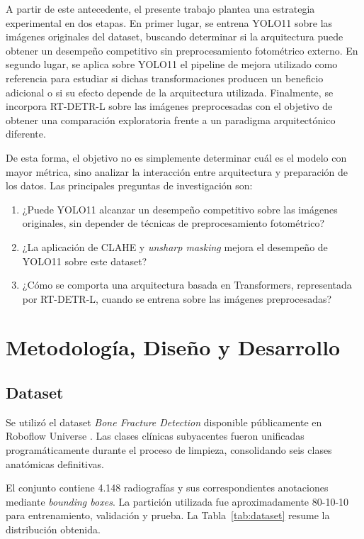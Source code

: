 \documentclass[conference]{IEEEtran}
\begin{document}
A partir de este antecedente, el presente trabajo plantea una estrategia experimental en dos etapas. En primer lugar, se entrena YOLO11 sobre las imágenes originales del dataset, buscando determinar si la arquitectura puede obtener un desempeño competitivo sin preprocesamiento fotométrico externo. En segundo lugar, se aplica sobre YOLO11 el pipeline de mejora utilizado como referencia para estudiar si dichas transformaciones producen un beneficio adicional o si su efecto depende de la arquitectura utilizada. Finalmente, se incorpora RT-DETR-L sobre las imágenes preprocesadas con el objetivo de obtener una comparación exploratoria frente a un paradigma arquitectónico diferente.

De esta forma, el objetivo no es simplemente determinar cuál es el modelo con mayor métrica, sino analizar la interacción entre arquitectura y preparación de los datos. Las principales preguntas de investigación son:

\begin{enumerate}
    \item ¿Puede YOLO11 alcanzar un desempeño competitivo sobre las imágenes originales, sin depender de técnicas de preprocesamiento fotométrico?
    \item ¿La aplicación de CLAHE y \textit{unsharp masking} mejora el desempeño de YOLO11 sobre este dataset?
    \item ¿Cómo se comporta una arquitectura basada en Transformers, representada por RT-DETR-L, cuando se entrena sobre las imágenes preprocesadas?
\end{enumerate}



\section{Metodología, Diseño y Desarrollo}

\subsection{Dataset}

Se utilizó el dataset \textit{Bone Fracture Detection} disponible públicamente en Roboflow Universe \cite{b6_robo}. Las clases clínicas subyacentes fueron unificadas programáticamente durante el proceso de limpieza, consolidando seis clases anatómicas definitivas.

El conjunto contiene 4.148 radiografías y sus correspondientes anotaciones mediante \textit{bounding boxes}. La partición utilizada fue aproximadamente 80-10-10 para entrenamiento, validación y prueba. La Tabla~\ref{tab:dataset} resume la distribución obtenida.
\end{document}
